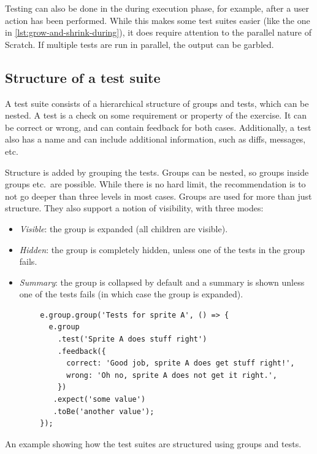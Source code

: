 \documentclass[../main]{subfiles}
\begin{document}
Testing can also be done in the during execution phase, for example, after a user action has been performed.
While this makes some test suites easier (like the one in \cref{lst:grow-and-shrink-during}), it does require attention to the parallel nature of Scratch.
If multiple tests are run in parallel, the output can be garbled.

\subsection{Structure of a test suite}\label{subsec:structure-of-a-test-suite2}

A test suite consists of a hierarchical structure of groups and tests, which can be nested.
A test is a check on some requirement or property of the exercise.
It can be correct or wrong, and can contain feedback for both cases.
Additionally, a test also has a name and can include additional information, such as diffs, messages, etc.

Structure is added by grouping the tests.
Groups can be nested, so groups inside groups etc.\ are possible.
While there is no hard limit, the recommendation is to not go deeper than three levels in most cases.
Groups are used for more than just structure.
They also support a notion of visibility, with three modes:

\begin{itemize}[noitemsep]
    \item \emph{Visible}: the group is expanded (all children are visible).
    \item \emph{Hidden}: the group is completely hidden, unless one of the tests in the group fails.
    \item \emph{Summary}: the group is collapsed by default and a summary is shown unless one of the tests fails (in which case the group is expanded).
\end{itemize}

\begin{listing}
    \centering
    \begin{verbatim}
        e.group.group('Tests for sprite A', () => {
          e.group
            .test('Sprite A does stuff right')
            .feedback({
              correct: 'Good job, sprite A does get stuff right!',
              wrong: 'Oh no, sprite A does not get it right.',
            })
           .expect('some value')
           .toBe('another value');
        });
    \end{verbatim}
    \caption{An example showing how the test suites are structured using groups and tests.}\label{lst:itch-test-suite-structure}
\end{listing}
\end{document}
